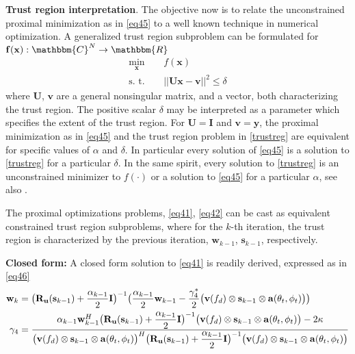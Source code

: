 \documentclass[11pt,draftclsnofoot,onecolumn]{IEEEtran}
\theoremstyle{definition}
\theoremstyle{remark}
\begin{document}
{\bf Trust region interpretation}. The objective now is to relate the unconstrained proximal minimization as in \eqref{eq45} to  a well known technique in numerical optimization. A generalized trust region subproblem can be formulated for $\mathbf{f}(\mathbf{x}):\mathbbm{C}^N\rightarrow \mathbbm{R}$ \cite{More93}
\begin{align}\label{trustreg}
\min \limits_{\mathbf{x}} \;\;\; &f( \mathbf{x}) \nonumber \\
\mbox{s. t. } \;\;\; & || \mathbf{U}\mathbf{x}-\mathbf{v}||^2 \leq \delta
\end{align}
where $\mathbf{U}$, $\mathbf{v}$ are a general nonsingular matrix, and a vector, both characterizing the trust region. The positive scalar $\delta$ may be interpreted as  a parameter which specifies the extent of the trust region. For $\mathbf{U}=\mathbf{I}$ and $\mathbf{v}=\mathbf{y}$,  the proximal minimization as in  \eqref{eq45} and the trust region problem in \eqref{trustreg} are equivalent for specific values of $\alpha$ and $\delta$. In particular every solution of \eqref{eq45} is a solution to \eqref{trustreg} for  a particular $\delta$. In the same spirit, every solution to \eqref{trustreg} is an unconstrained minimizer to $f(\cdot)$ or a  solution to \eqref{eq45} for a particular $\alpha$, see also \cite{Rockafeller1976,Parikh2013}. 

The proximal optimizations problems, \eqref{eq41}, \eqref{eq42} can be cast as equivalent constrained trust region subproblems, where for the $k$-th iteration, the trust region is characterized by the previous iteration, $\mathbf{w}_{k-1}$, $\mathbf{s}_{k-1}$, respectively.

{\bf Closed form:} A closed form solution to \eqref{eq41} is readily derived, expressed as in \eqref{eq46} 
\begin{equation} \label{eq46}
\begin{aligned} \mathbf{w}_{k}&=\big( \mathbf{R}_{\bf u}(\mathbf{s}_{k-1})+\frac{\alpha_{k-1}}{2}\mathbf{I} \big)^{-1} \big( \frac{\alpha_{k-1}}{2}\mathbf{w}_{k-1}-\frac{\gamma_4^{\ast}}{2} \big(\mathbf{v}(f_d)\otimes\mathbf{s}_{k-1}\otimes\mathbf{a}(\theta_t,\phi_t) \big) \big) \\
\gamma_4&=\frac{\alpha_{k-1} \mathbf{w}_{k-1}^H \big( \mathbf{R}_{\bf u}(\mathbf{s}_{k-1})+\dfrac{\alpha_{k-1}}{2}\mathbf{I} \big)^{-1} \big(\mathbf{v}(f_d)\otimes\mathbf{s}_{k-1}\otimes\mathbf{a}(\theta_t,\phi_t) \big)-2\kappa }{\big(\mathbf{v}(f_d)\otimes\mathbf{s}_{k-1}\otimes\mathbf{a}(\theta_t,\phi_t) \big)^H
\big( \mathbf{R}_{\bf u}(\mathbf{s}_{k-1})+\dfrac{\alpha_{k-1}}{2}\mathbf{I} \big)^{-1}
 \big(\mathbf{v}(f_d)\otimes\mathbf{s}_{k-1}\otimes\mathbf{a}(\theta_t,\phi_t) \big)} \end{aligned}
\end{equation} 
\end{document}
